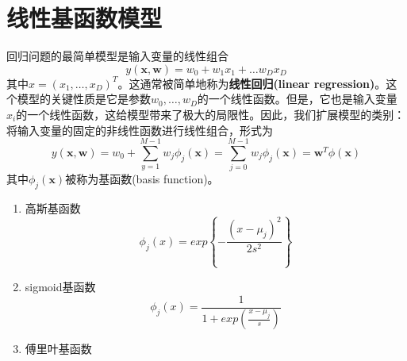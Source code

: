 \section{线性基函数模型}
回归问题的最简单模型是输入变量的线性组合
$$
y(\boldsymbol{x,w})=w_0+w_1x_1 + \dots w_Dx_D
$$
其中$x=(x_1,\dots,x_D)^T$。这通常被简单地称为\textbf{线性回归(linear regression)}。这个模型的关键性质是它是参数$w_0,\dots,w_D$的一个线性函数。但是，它也是输入变量$x_i$的一个线性函数，这给模型带来了极大的局限性。因此，我们扩展模型的类别：将输入变量的固定的非线性函数进行线性组合，形式为
$$
y(\boldsymbol{x,w})=w_0+\sum_{y=1}^{M-1}w_j\phi_j(\boldsymbol{x})=\sum_{j=0}^{M-1}w_j\phi_j(\boldsymbol{x})=\boldsymbol{w}^T\phi(\boldsymbol{x})
$$
其中$\phi_j(\boldsymbol{x})$被称为基函数(basis function)。
\begin{enumerate}
	\item 高斯基函数 
	$$
	\phi_j(x)=exp\left\{-\frac{(x-\mu_j)^2}{2s^2}\right\}
	$$
	\item sigmoid基函数 
	$$
	\phi_j(x)=\frac{1}{1+exp\left(\frac{x-\mu_j}{s}\right)}
	$$
	\item 傅里叶基函数
\end{enumerate}